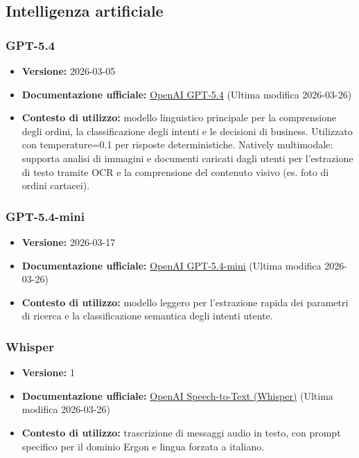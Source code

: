 \documentclass[a4paper, 11pt, oneside]{scrartcl}
\begin{document}
\subsection{Intelligenza artificiale}

\subsubsection{GPT-5.4}
\begin{itemize}[noitemsep]
    \item \textbf{Versione:} 2026-03-05
    \item \textbf{Documentazione ufficiale:} \href{https://platform.openai.com/docs/models/gpt-5.4}{OpenAI GPT-5.4} (Ultima modifica 2026-03-26)
    \item \textbf{Contesto di utilizzo:} modello linguistico principale per la comprensione degli ordini, la classificazione degli intenti e le decisioni di business. Utilizzato con temperature=0.1 per risposte deterministiche. Natively multimodale: supporta analisi di immagini e documenti caricati dagli utenti per l'estrazione di testo tramite OCR e la comprensione del contenuto visivo (es. foto di ordini cartacei).
\end{itemize}

\subsubsection{GPT-5.4-mini}
\begin{itemize}[noitemsep]
    \item \textbf{Versione:} 2026-03-17
    \item \textbf{Documentazione ufficiale:} \href{https://platform.openai.com/docs/models/gpt-5.4-mini}{OpenAI GPT-5.4-mini} (Ultima modifica 2026-03-26)
    \item \textbf{Contesto di utilizzo:} modello leggero per l'estrazione rapida dei parametri di ricerca e la classificazione semantica degli intenti utente.
\end{itemize}

\subsubsection{Whisper}
\begin{itemize}[noitemsep]
    \item \textbf{Versione:} 1
    \item \textbf{Documentazione ufficiale:} \href{https://platform.openai.com/docs/guides/speech-to-text}{OpenAI Speech-to-Text (Whisper)} (Ultima modifica 2026-03-26)
    \item \textbf{Contesto di utilizzo:} trascrizione di messaggi audio in testo, con prompt specifico per il dominio Ergon e lingua forzata a italiano.
\end{itemize}
\end{document}
